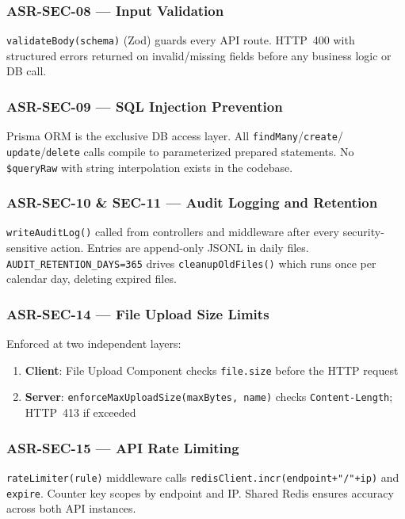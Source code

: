 \documentclass[12pt,a4paper]{article}
\begin{document}
\subsubsection{ASR-SEC-08 --- Input Validation}
\texttt{validateBody(schema)} (Zod) guards every API route.  HTTP~400 with structured
errors returned on invalid/missing fields before any business logic or DB call.

\subsubsection{ASR-SEC-09 --- SQL Injection Prevention}
Prisma ORM is the exclusive DB access layer.  All \texttt{findMany}/\texttt{create}/
\texttt{update}/\texttt{delete} calls compile to parameterized prepared statements.
No \texttt{\$queryRaw} with string interpolation exists in the codebase.

\subsubsection{ASR-SEC-10 \& SEC-11 --- Audit Logging and Retention}
\texttt{writeAuditLog()} called from controllers and middleware after every
security-sensitive action.  Entries are append-only JSONL in daily files.
\texttt{AUDIT\_RETENTION\_DAYS=365} drives \texttt{cleanupOldFiles()} which runs once
per calendar day, deleting expired files.

\subsubsection{ASR-SEC-14 --- File Upload Size Limits}
Enforced at two independent layers:
\begin{enumerate}[noitemsep]
  \item \textbf{Client}: File Upload Component checks \texttt{file.size} before the HTTP request
  \item \textbf{Server}: \texttt{enforceMaxUploadSize(maxBytes, name)} checks \texttt{Content-Length}; HTTP~413 if exceeded
\end{enumerate}

\subsubsection{ASR-SEC-15 --- API Rate Limiting}
\texttt{rateLimiter(rule)} middleware calls \texttt{redisClient.incr(endpoint+"/"+ip)} and
\texttt{expire}.  Counter key scopes by endpoint and IP.  Shared Redis ensures accuracy
across both API instances.
\end{document}
